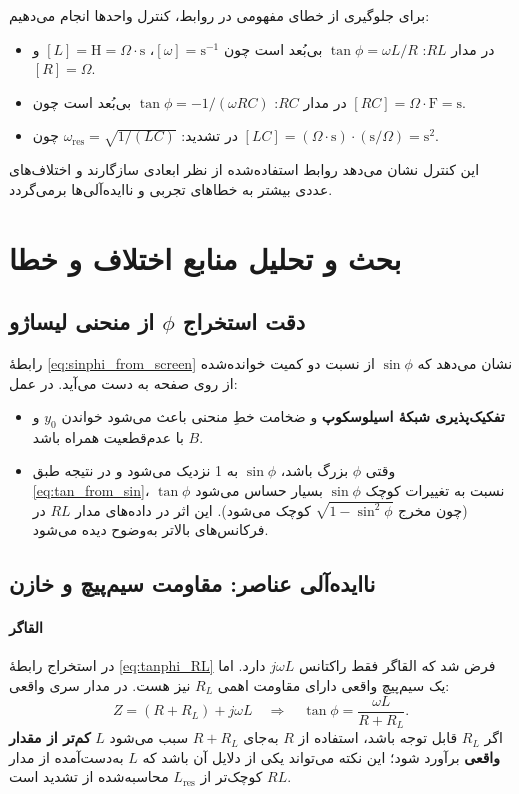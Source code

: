 \documentclass[a4paper, 11pt]{article}
\begin{document}
برای جلوگیری از خطای مفهومی در روابط، کنترل واحدها انجام می‌دهیم:
\begin{itemize}
    \item در مدار $RL$: \(\tan\phi=\omega L/R\) بی‌بُعد است چون \([\omega]=\mathrm{s^{-1}}\)، \([L]=\mathrm{H}=\Omega\cdot \mathrm{s}\) و \([R]=\Omega\).
    \item در مدار $RC$: \(\tan\phi=-1/(\omega RC)\) بی‌بُعد است چون \([RC]=\Omega\cdot\mathrm{F}=\mathrm{s}\).
    \item در تشدید: \(\omega_{\mathrm{res}}=\sqrt{1/(LC)}\) چون \([LC]=(\Omega\cdot\mathrm{s})\cdot(\mathrm{s}/\Omega)=\mathrm{s^2}\).
\end{itemize}
این کنترل نشان می‌دهد روابط استفاده‌شده از نظر ابعادی سازگارند و اختلاف‌های عددی بیشتر به خطاهای تجربی و ناایده‌آلی‌ها برمی‌گردد.

\section{بحث و تحلیل منابع اختلاف و خطا}

\subsection{دقت استخراج \(\phi\) از منحنی لیساژو}

رابطهٔ \eqref{eq:sinphi_from_screen} نشان می‌دهد که \(\sin\phi\) از نسبت دو کمیت خوانده‌شده از روی صفحه به دست می‌آید. در عمل:
\begin{itemize}
    \item \textbf{تفکیک‌پذیری شبکهٔ اسیلوسکوپ} و ضخامت خطِ منحنی باعث می‌شود خواندن \(y_0\) و \(B\) با عدم‌قطعیت همراه باشد.
    \item وقتی \(\phi\) بزرگ باشد، \(\sin\phi\) به 1 نزدیک می‌شود و در نتیجه طبق \eqref{eq:tan_from_sin}، \(\tan\phi\) نسبت به تغییرات کوچک \(\sin\phi\) بسیار حساس می‌شود (چون مخرج \(\sqrt{1-\sin^2\phi}\) کوچک می‌شود). این اثر در داده‌های مدار $RL$ در فرکانس‌های بالاتر به‌وضوح دیده می‌شود.
\end{itemize}

\subsection{ناایده‌آلی عناصر: مقاومت سیم‌پیچ و  خازن}

\paragraph{القاگر}
در استخراج رابطهٔ \eqref{eq:tanphi_RL} فرض شد که القاگر فقط راکتانس \(j\omega L\) دارد. اما یک سیم‌پیچ واقعی دارای مقاومت اهمی \(R_L\) نیز هست. در مدار سری واقعی:
\[
Z=(R+R_L)+j\omega L
\quad\Rightarrow\quad
\tan\phi=\frac{\omega L}{R+R_L}.
\]
اگر \(R_L\) قابل توجه باشد، استفاده از \(R\) به‌جای \(R+R_L\) سبب می‌شود \(L\) \textbf{کم‌تر از مقدار واقعی} برآورد شود؛ این نکته می‌تواند یکی از دلایل آن باشد که \(L\) به‌دست‌آمده از مدار $RL$ کوچک‌تر از \(L_{\mathrm{res}}\) محاسبه‌شده از تشدید است.
\end{document}
